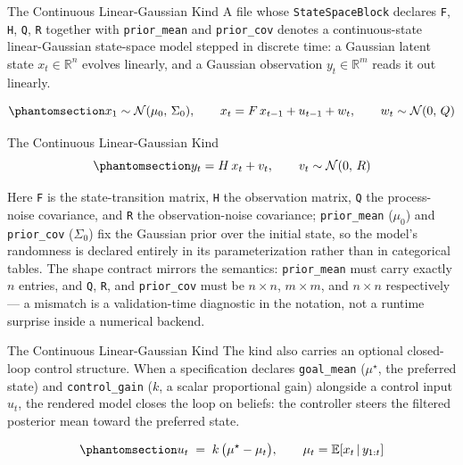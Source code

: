 \documentclass[
  ignorenonframetext,
]{beamer}
\begin{document}
\begin{frame}{The Continuous Linear-Gaussian
Kind}
\protect{}\label{the-continuous-linear-gaussian-kind}
A file whose \texttt{StateSpaceBlock} declares \texttt{F}, \texttt{H},
\texttt{Q}, \texttt{R} together with \texttt{prior\_mean} and
\texttt{prior\_cov} denotes a continuous-state linear-Gaussian
state-space model stepped in discrete time: a Gaussian latent state
\(x_t \in \mathbb{R}^n\) evolves linearly, and a Gaussian observation
\(y_t \in \mathbb{R}^m\) reads it out linearly.

\begin{equation}\protect\phantomsection\label{eq:lgssm_state}{
x_1 \sim \mathcal{N}(\mu_0,\, \Sigma_0), \qquad x_t = F\, x_{t-1} + u_{t-1} + w_t, \qquad w_t \sim \mathcal{N}(0,\, Q)
}\end{equation}

\end{frame}

\begin{frame}{The Continuous Linear-Gaussian
Kind}
\begin{equation}\protect\phantomsection\label{eq:lgssm_obs}{
y_t = H\, x_t + v_t, \qquad v_t \sim \mathcal{N}(0,\, R)
}\end{equation}

Here \texttt{F} is the state-transition matrix, \texttt{H} the
observation matrix, \texttt{Q} the process-noise covariance, and
\texttt{R} the observation-noise covariance; \texttt{prior\_mean}
(\(\mu_0\)) and \texttt{prior\_cov} (\(\Sigma_0\)) fix the Gaussian
prior over the initial state, so the model's randomness is declared
entirely in its parameterization rather than in categorical tables. The
shape contract mirrors the semantics: \texttt{prior\_mean} must carry
exactly \(n\) entries, and \texttt{Q}, \texttt{R}, and
\texttt{prior\_cov} must be \(n \times n\), \(m \times m\), and
\(n \times n\) respectively --- a mismatch is a validation-time
diagnostic in the notation, not a runtime surprise inside a numerical
backend.

\end{frame}

\begin{frame}{The Continuous Linear-Gaussian
Kind}
The kind also carries an optional closed-loop control structure. When a
specification declares \texttt{goal\_mean} (\(\mu^\star\), the preferred
state) and \texttt{control\_gain} (\(k\), a scalar proportional gain)
alongside a control input \(u_t\), the rendered model closes the loop on
beliefs: the controller steers the filtered posterior mean toward the
preferred state.

\begin{equation}\protect\phantomsection\label{eq:closed_loop}{
u_t \;=\; k \,\bigl(\mu^\star - \mu_t\bigr), \qquad \mu_t = \mathbb{E}\!\left[x_t \,\middle|\, y_{1:t}\right]
}\end{equation}

\end{frame}
\end{document}
